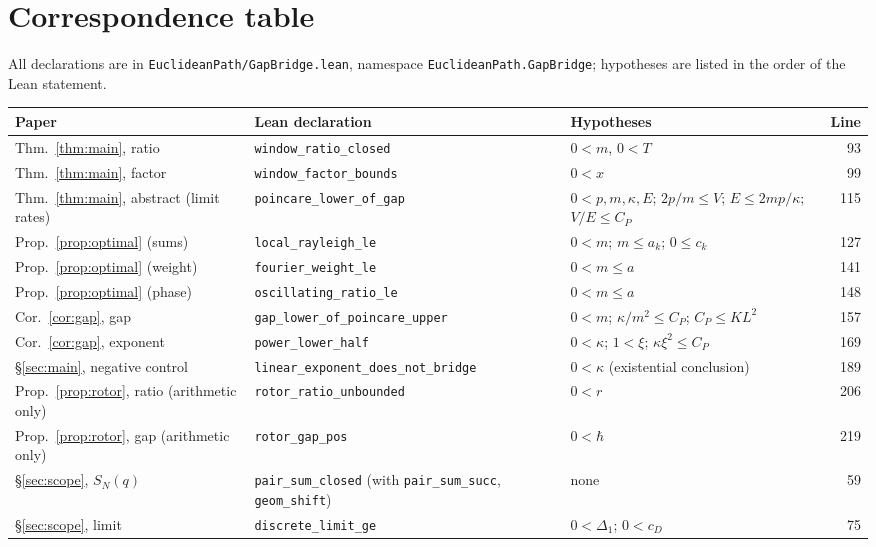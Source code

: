 \documentclass[11pt,a4paper]{article}
\theoremstyle{definition}
\theoremstyle{remark}
\newcommand{\code}[1]{\texttt{#1}}
\begin{document}
\section{Correspondence table}\label{sec:corr}

{\sloppy All declarations are in \code{EuclideanPath/\allowbreak{}GapBridge.lean}, namespace \code{EuclideanPath.\allowbreak{}GapBridge}; hypotheses are listed in the order of the Lean statement.\par}

\begin{center}\small
\begin{longtable}{@{}p{}p{}p{}r@{}}
\toprule
Paper & Lean declaration & Hypotheses & Line\\ \midrule
\endhead
Thm.~\ref{thm:main}, ratio & \code{window\_ratio\_closed} & $0<m$, $0<T$ & 93\\
Thm.~\ref{thm:main}, factor & \code{window\_factor\_bounds} & $0<x$ & 99\\
Thm.~\ref{thm:main}, abstract (limit rates) & \code{poincare\_lower\_of\_gap} & $0<p,m,\kappa,E$; $2p/m\le V$; $E\le2mp/\kappa$; $V/E\le C_P$ & 115\\
Prop.~\ref{prop:optimal} (sums) & \code{local\_rayleigh\_le} & $0<m$; $m\le a_k$; $0\le c_k$ & 127\\
Prop.~\ref{prop:optimal} (weight) & \code{fourier\_weight\_le} & $0<m\le a$ & 141\\
Prop.~\ref{prop:optimal} (phase) & \code{oscillating\_ratio\_le} & $0<m\le a$ & 148\\
Cor.~\ref{cor:gap}, gap & \code{gap\_lower\_of\_poincare\_upper} & $0<m$; $\kappa/m^2\le C_P$; $C_P\le KL^2$ & 157\\
Cor.~\ref{cor:gap}, exponent & \code{power\_lower\_half} & $0<\kappa$; $1<\xi$; $\kappa\xi^2\le C_P$ & 169\\
\S\ref{sec:main}, negative control & \code{linear\_exponent\_\allowbreak{}does\_not\_bridge} & $0<\kappa$ (existential conclusion) & 189\\
Prop.~\ref{prop:rotor}, ratio (arithmetic only) & \code{rotor\_ratio\_unbounded} & $0<r$ & 206\\
Prop.~\ref{prop:rotor}, gap (arithmetic only) & \code{rotor\_gap\_pos} & $0<\hbar$ & 219\\
\S\ref{sec:scope}, $S_N(q)$ & \code{pair\_sum\_closed} (with \code{pair\_sum\_succ}, \code{geom\_shift}) & none & 59\\
\S\ref{sec:scope}, limit & \code{discrete\_limit\_ge} & $0<\Delta_1$; $0<c_D$ & 75\\
\bottomrule
\end{longtable}
\end{center}
\end{document}
